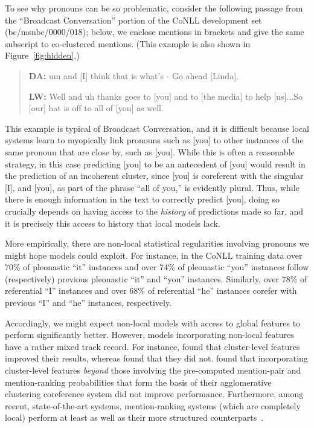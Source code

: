 \documentclass[11pt,letterpaper]{article}
\begin{document}
To see why pronouns can be so problematic, consider the following passage from the ``Broadcast Conversation'' portion of the CoNLL development set (bc/msnbc/0000/018); below, we enclose mentions in brackets and give the same subscript to co-clustered mentions. (This example is also shown in Figure~\ref{fig:hidden}.)

\vspace{-1mm}
{\small
\begin{quote}
\small
\textbf{DA:} um and [I] think that is what's - Go ahead [Linda].

\textbf{LW:} Well and uh thanks goes to [you] and to [the media] to help [us]...So [our] hat is off to all of [you] as well.
\end{quote} 
}

\vspace{-1mm}
\noindent This example is typical of Broadcast Conversation, and it is difficult because local systems learn to myopically link pronouns such as [you] to other instances of the same pronoun that are close by, such as [you]. While this is often a reasonable strategy, in this case predicting [you] to be an antecedent of [you] would result in the prediction of an incoherent cluster, since [you] is coreferent with the singular [I], and [you], as part of the phrase ``all of you,'' is evidently plural. Thus, while there is enough information in the text to correctly predict [you], doing so crucially depends on having access to the \textit{history} of predictions made so far, and it is precisely this access to history that local models lack. 

More empirically, there are non-local statistical regularities involving pronouns we might hope models could exploit. For instance, in the CoNLL training data over 70\% of pleonastic ``it'' instances and over 74\% of pleonastic ``you'' instances follow (respectively) previous pleonastic ``it'' and ``you'' instances. Similarly, over 78\% of referential ``I'' instances and over 68\% of referential ``he'' instances corefer with previous ``I'' and ``he'' instances, respectively.

Accordingly, we might expect non-local models with access to global features to perform significantly better. However, models incorporating non-local features have a rather mixed track record. For instance,  found that cluster-level features improved their results, whereas  found that they did not.  found that incorporating cluster-level features \textit{beyond} those involving the pre-computed mention-pair and mention-ranking probabilities that form the basis of their agglomerative clustering coreference system did not improve performance. Furthermore, among recent, state-of-the-art systems, mention-ranking systems (which are completely local) perform at least as well as their more structured counterparts~\cite{DandK:14,clark15entity,wiseman15learning,peng15a}. 
\end{document}
